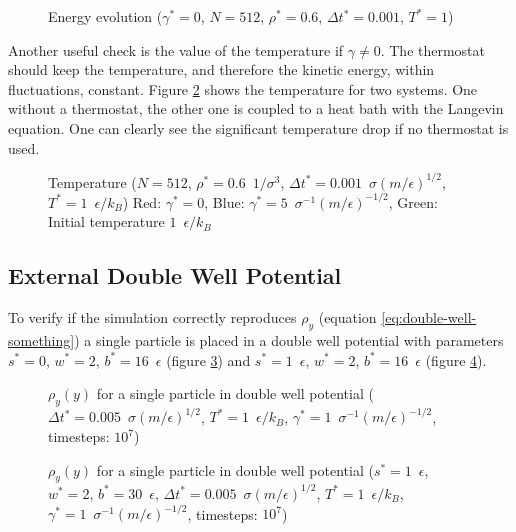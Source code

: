 \documentclass[a4paper]{article}
\begin{document}
\begin{figure} [H]
\centering
\scalebox{1.1}{}
\caption{Energy evolution ($\gamma^* = 0$, $N = 512$, $\rho^* = 0.6$, $\Delta t^* = 0.001 $, $T^* = 1 $)}
\label{im:total_energy}
\end{figure}

Another useful check is the value of the temperature if $\gamma \neq 0$. The thermostat should keep the temperature, and therefore the kinetic energy, within fluctuations, constant. Figure \ref{im:temperature} shows the temperature for two systems. One without a thermostat, the other one is coupled to a heat bath with the Langevin equation. One can clearly see the significant temperature drop if no thermostat is used.

\begin{figure} [H]
\centering
\scalebox{1.1}{}
\caption{Temperature ($N = 512$, $\rho^* = 0.6 \enspace 1/\sigma^3$, $\Delta t^* = 0.001 \enspace \sigma (m/\epsilon)^{1/2}$, $T^* = 1 \enspace \epsilon/k_B$) Red: $\gamma^* = 0$, Blue: $\gamma^* = 5 \enspace \sigma^{-1} (m/\epsilon)^{-1/2}$, Green: Initial temperature $1 \enspace \epsilon/k_B$}
\label{im:temperature}
\end{figure}

\subsection{External Double Well Potential}

To verify if the simulation correctly reproduces $\rho_y$ (equation \ref{eq:double-well-something}) a single particle is placed in a double well potential with parameters $s^* = 0$, $w^* = 2$, $b^* = 16 \enspace \epsilon$ (figure \ref{im:distribution_double_well}) and $s^* = 1 \enspace \epsilon$, $w^* = 2$, $b^* = 16 \enspace \epsilon$ (figure \ref{im:distribution_double_well_2}). 

\begin{figure} [H]
\centering
\scalebox{.9}{}
\caption{$\rho_y(y)$ for a single particle in double well potential ($\Delta t^* = 0.005 \enspace \sigma (m/\epsilon)^{1/2}$, $T^* = 1 \enspace \epsilon/k_B$, $\gamma^* = 1 \enspace \sigma^{-1} (m/\epsilon)^{-1/2}$, timesteps: $10^7$)}
\label{im:distribution_double_well}
\end{figure}

\begin{figure} [H]
\centering
\scalebox{.9}{}
\caption{$\rho_y(y)$ for a single particle in double well potential ($s^* = 1 \enspace \epsilon$, $w^* = 2$, $b^* = 30 \enspace \epsilon$, $\Delta t^* = 0.005 \enspace \sigma (m/\epsilon)^{1/2}$, $T^* = 1 \enspace \epsilon/k_B$, $\gamma^* = 1 \enspace \sigma^{-1} (m/\epsilon)^{-1/2}$, timesteps: $10^7$)}
\label{im:distribution_double_well_2}
\end{figure}
\end{document}
